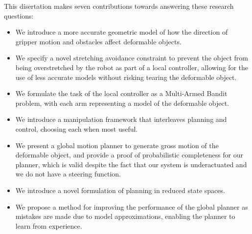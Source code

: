 This disertation makes seven contributions towards answering these research questions:
\begin{itemize}
 \item We introduce a more accurate geometric model of how the direction of gripper motion and obstacles affect deformable objects.
 \item We specify a novel stretching avoidance constraint to prevent the object from being overstretched by the robot as part of a local controller, allowing for the use of less accurate models without risking tearing the deformable object.
 \item We formulate the task of the local controller as a Multi-Armed Bandit problem, with each arm representing a model of the deformable object.
 \item We introduce a manipulation framework that interleaves planning and control, choosing each when most useful.
 \item We present a global motion planner to generate gross motion of the deformable object, and provide a proof of probabilistic completeness for our planner, which is valid despite the fact that our system is underactuated and we do not have a steering function.
 \item We introduce a novel formulation of planning in reduced state spaces.
 \item We propose a method for improving the performance of the global planner as mistakes are made due to model approximations, enabling the planner to learn from experience.
\end{itemize}
